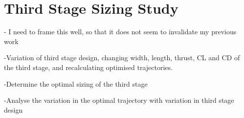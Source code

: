 
\chapter{Third Stage Sizing Study}

- I need to frame this well, so that it does not seem to invalidate my previous work

-Variation of third stage design, changing width, length, thrust, CL and CD of the third stage, and recalculating optimised trajectories.

-Determine the optimal sizing of the third stage 

-Analyse the variation in the optimal trajectory with variation in third stage design


